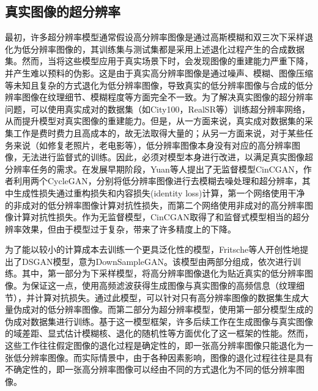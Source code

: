 \subsection{真实图像的超分辨率}
最初，许多超分辨率模型通常假设高分辨率图像是通过高斯模糊和双三次下采样退化为低分辨率图像的，其训练集与测试集都是采用上述退化过程产生的合成数据集。然而，当将这些模型应用于真实场景下时，会发现图像的重建能力严重下降，并产生难以预料的伪影。这是由于真实高分辨率图像是通过噪声、模糊、图像压缩等未知且复杂的方式退化为低分辨率图像，导致真实的低分辨率图像与合成的低分辨率图像在纹理细节、模糊程度等方面完全不一致。为了解决真实图像的超分辨率问题，可以使用真实成对的数据集（如City100，RealSR等）训练超分辨率网络，从而提升模型对真实图像的重建能力。但是，从一方面来说，真实成对数据集的采集工作是费时费力且高成本的，故无法取得大量的；从另一方面来说，对于某些任务来说（如修复老照片，老电影等），低分辨率图像本身没有对应的高分辨率图像，无法进行监督式的训练。因此，必须对模型本身进行改进，以满足真实图像超分辨率任务的需求。在发展早期阶段，Yuan等人提出了无监督模型CinCGAN，作者利用两个CycleGAN，分别将低分辨率图像进行去模糊去噪处理和超分辨率，其中生成性损失通过重构损失和内容损失(identity loss)计算，第一个网络使用干净的非成对的低分辨率图像计算对抗性损失，而第二个网络使用非成对的高分辨率图像计算对抗性损失。作为无监督模型，CinCGAN取得了和监督式模型相当的超分辨率效果，但由于模型过于复杂，带来了许多精度上的下降。

为了能以较小的计算成本去训练一个更具泛化性的模型，Fritsche等人开创性地提出了DSGAN模型，意为DownSampleGAN。该模型由两部分组成，依次进行训练。其中，第一部分为下采样模型，将高分辨率图像退化为贴近真实的低分辨率图像。为保证这一点，使用高频滤波获得生成图像与真实图像的高频信息（纹理细节），并计算对抗损失。通过此模型，可以针对只有高分辨率图像的数据集生成大量伪成对的低分辨率图像。而第二部分为超分辨率模型，使用第一部分模型生成的伪成对数据集进行训练。基于这一模型框架，许多后续工作在生成图像与真实图像的域差距、显式估计模糊核、退化的随机性等方面优化了这一框架的性能。然而，这些工作往往假定图像的退化过程是确定性的，即一张高分辨率图像只能退化为一张低分辨率图像。而实际情景中，由于各种因素影响，图像的退化过程往往是具有不确定性的，即一张高分辨率图像可以经由不同的方式退化为不同的低分辨率图像。


